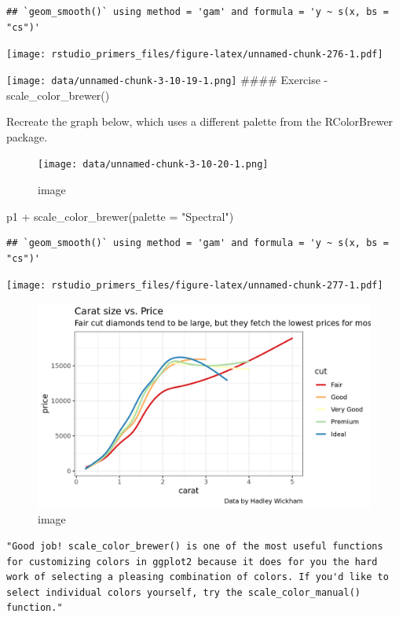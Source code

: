 \documentclass[
]{article}
\newenvironment{Shaded}{\begin{snugshade}}{\end{snugshade}}
\newcommand{\AttributeTok}[1]{\textcolor[rgb]{0.77,0.63,0.00}{#1}}
\newcommand{\FunctionTok}[1]{\textcolor[rgb]{0.00,0.00,0.00}{#1}}
\newcommand{\NormalTok}[1]{#1}
\newcommand{\SpecialCharTok}[1]{\textcolor[rgb]{0.00,0.00,0.00}{#1}}
\newcommand{\StringTok}[1]{\textcolor[rgb]{0.31,0.60,0.02}{#1}}
\begin{document}
\begin{verbatim}
## `geom_smooth()` using method = 'gam' and formula = 'y ~ s(x, bs = "cs")'
\end{verbatim}

\texttt{[image: rstudio\_primers\_files/figure-latex/unnamed-chunk-276-1.pdf]}

\texttt{[image: data/unnamed-chunk-3-10-19-1.png]} \#\#\#\# Exercise -
scale\_color\_brewer()

Recreate the graph below, which uses a different palette from the
RColorBrewer package.

\begin{figure}
\centering
\texttt{[image: data/unnamed-chunk-3-10-20-1.png]}
\caption{image}
\end{figure}

\begin{Shaded}
\begin{Highlighting}[]
\NormalTok{p1 }\SpecialCharTok{+} \FunctionTok{scale\_color\_brewer}\NormalTok{(}\AttributeTok{palette =} \StringTok{"Spectral"}\NormalTok{)}
\end{Highlighting}
\end{Shaded}

\begin{verbatim}
## `geom_smooth()` using method = 'gam' and formula = 'y ~ s(x, bs = "cs")'
\end{verbatim}

\texttt{[image: rstudio\_primers\_files/figure-latex/unnamed-chunk-277-1.pdf]}

\begin{figure}
\centering
\includegraphics{data/3-10-image.png}
\caption{image}
\end{figure}

\begin{verbatim}
"Good job! scale_color_brewer() is one of the most useful functions for customizing colors in ggplot2 because it does for you the hard work of selecting a pleasing combination of colors. If you'd like to select individual colors yourself, try the scale_color_manual() function."
\end{verbatim}
\end{document}
